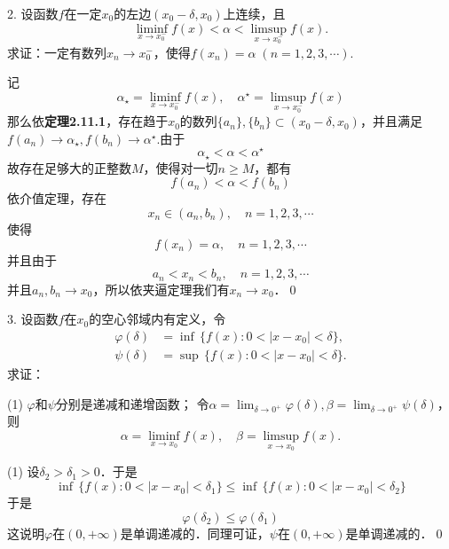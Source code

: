 2. 设函数$f$在一定$x_0$的左边$(x_0-\delta,x_0)$上连续，且
\begin{equation*}
    \liminf_{x \to x_0^-} f(x) < \alpha < \limsup_{x \to x_0^-} f(x).
\end{equation*}
求证：一定有数列$x_n \to x_0^-$，使得$f(x_n)=\alpha \; (n=1,2,3,\cdots)$.

\prove 记
\begin{equation}
    \alpha_\star = \liminf_{x \to x_0^-} f(x), \quad \alpha^\star = \limsup_{x \to x_0^-} f(x)
\end{equation}
那么依\textbf{定理2.11.1}，存在趋于$x_0$的数列$\{ a_n \}, \{ b_n \} \subset (x_0 - \delta, x_0)$，并且满足$f(a_n) \to \alpha_\star, f(b_n) \to \alpha^\star$.由于
\begin{equation}
    \alpha_\star < \alpha < \alpha^\star
\end{equation}
故存在足够大的正整数$M$，使得对一切$n \geq M$，都有
\begin{equation}
    f(a_n) < \alpha < f(b_n)
\end{equation}
依介值定理，存在
\begin{equation}
    x_n \in (a_n, b_n), \quad n = 1,2,3,\cdots
\end{equation}
使得
\begin{equation}
    f(x_n) = \alpha, \quad n = 1,2,3,\cdots
\end{equation}
并且由于
\begin{equation}
    a_n < x_n < b_n, \quad n = 1,2,3,\cdots
\end{equation}
并且$a_n, b_n \to x_0$，所以依夹逼定理我们有$x_n \to x_0$．\qed\bigskip

3. 设函数$f$在$x_0$的空心邻域内有定义，令
\begin{align*}
    \varphi\left(\delta\right) &= \inf \, \{ f(x) : 0 < \lvert x - x_0 \rvert < \delta \}, \\
    \psi\left(\delta\right) &= \sup \, \{ f(x) : 0 < \lvert x - x_0 \rvert < \delta \} .
\end{align*}
求证：
\begin{tasks}(1)
    \task $\varphi$和$\psi$分别是递减和递增函数；
    \task 令$\alpha = \displaystyle\lim_{\delta \to 0^+} \varphi (\delta), \beta = \displaystyle\lim_{\delta \to 0^+} \psi(\delta)$，则
    \begin{equation*}
        \alpha = \liminf_{x \to x_0} f(x), \quad \beta = \limsup_{x \to x_0} f(x).
    \end{equation*}
\end{tasks}

(1) \prove 设$\delta_2 > \delta_1 > 0$．于是
\begin{equation}
    \inf \, \{ f(x) : 0 < \lvert x - x_0 \rvert < \delta_1 \} \leq \inf \, \{ f(x) : 0 < \lvert x - x_0 \rvert < \delta_2 \}
\end{equation}
于是
\begin{equation*}
    \varphi (\delta_2) \leq \varphi (\delta_1)
\end{equation*}
这说明$\varphi$在$(0, +\infty)$是单调递减的．同理可证，$\psi$在$(0,+\infty)$是单调递减的．\qed\bigskip
